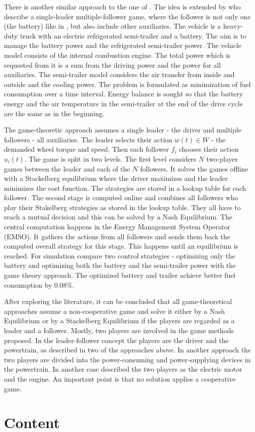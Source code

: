 
There is another similar approach to the one of \citet{dextreit2014game}. The idea is extended by \citet{chen2014game} who describe a single-leader multiple-follower game, where the follower is not only one (the battery) like in \citet{dextreit2014game}, but also include other auxiliaries. The vehicle is a heavy-duty truck with an electric refrigerated semi-trailer and a battery. The aim is to manage the battery power and the refrigerated semi-trailer power. The vehicle model consists of the internal combustion engine. The total power which is requested from it is a sum from the driving power and the power for all auxiliaries. The semi-trailer model considers the air transfer from inside and outside and the cooling power. The problem is formulated as minimization of fuel consumption over a time interval. Energy balance is sought so that the battery energy and the air temperature in the semi-trailer at the end of the drive cycle are the same as in the beginning.

The game-theoretic approach assumes a single leader - the driver and multiple followers - all auxiliaries. The leader selects their action $w(t) \in W$ - the demanded wheel torque and speed. Then each follower $f_i$ chooses their action $u_i(t)$. The game is split in two levels. The first level considers $N$ two-player games between the leader and each of the $N$ followers. It solves the games offline with a Stackelberg equilibrium where the driver maximizes and the leader minimizes the cost function. The strategies are stored in a lookup table for each follower. The second stage is computed online and combines all followers who play their Stakelberg strategies as stored in the lookup table. They all have to reach a mutual decision and this can be solved by a Nash Equilibrium. The central computation happens in the Energy Management System Operator (EMSO). It gathers the actions from all followers and sends them back the computed overall strategy for this stage. This happens until an equilibrium is reached. For simulation \citet{chen2014game} compare two control strategies - optimizing only the battery and optimizing both the battery and the semi-trailer power with the game theory approach. The optimized battery and trailer achieve better fuel consumption by 0.08\%.


After exploring the literature, it can be concluded that all game-theoretical approaches assume a non-cooperative game and solve it either by a Nash Equilibrium or by a Stackelberg Equilibrium if the players are regarded as a leader and a follower. Mostly, two players are involved in the game methods proposed. In the leader-follower concept the players are the driver and the powertrain, as described in two of the approaches above. In another approach the two players are divided into the power-consuming and power-supplying devices in the powertrain. In another case \citet{chin2010design} described the two players as the electric motor and the engine. An important point is that no solution applies a cooperative game.

\section{Content}
